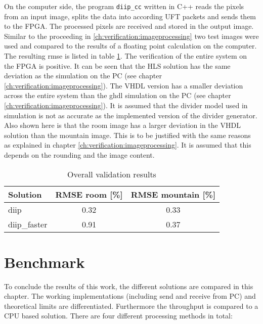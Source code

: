 On the computer side, the program \texttt{diip\_cc} written in C++ reads the
pixels from an input image, splits the data into according UFT packets and sends
them to the FPGA. The processed pixels are received and stored in the output
image. Similar to the proceeding in \ref{ch:verification:imageprocessing} two
test images were used and compared to the results of a floating point
calculation on the computer. The resulting \gls{rmse} is listed in table 
\ref{tab:overallvalidationresults}. The verification of the entire system on
the FPGA is positive. It can be seen that the HLS solution has the same
deviation as the simulation on the PC (see chapter 
\ref{ch:verification:imageprocessing}). The VHDL version has a smaller
deviation across the entire system than the \gls{ghdl} simulation on the PC (see
chapter \ref{ch:verification:imageprocessing}). It is assumed that the divider
model used in simulation is not as accurate as the implemented version of the
divider generator. Also shown here is that
the room image has a larger deviation in the VHDL solution than the
mountain image. This is to be justified with the same reasons as explained in
chapter \ref{ch:verification:imageprocessing}. It is assumed that this depends on the rounding and the image content. 


\begin{table}[tb!] \centering \begin{tabular}{l c c}
        \toprule
        Solution            & RMSE room [\%]    & RMSE mountain [\%]\\
        \midrule
        diip         & 0.32             & 0.33 \\
        diip\_faster & 0.91             & 0.37 \\
        \bottomrule
    \end{tabular}
    \caption{Overall validation results}
    \label{tab:overallvalidationresults}
\end{table}


%
%
\section{Benchmark}\label{ch:benchmark}
To conclude the results of this work, the different solutions are compared in
this chapter. The working implementations (including send and receive from PC)
and theoretical limits are differentiated. Furthermore the throughput is
compared to a CPU based solution.
There are four different processing methods in total:


